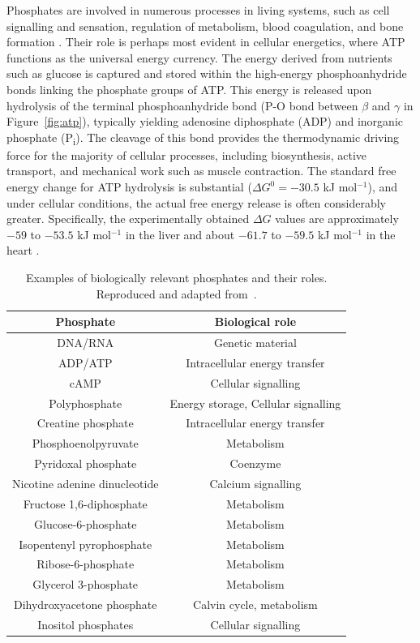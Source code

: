 Phosphates are involved in numerous processes in living systems, such as cell signalling and sensation, regulation of metabolism, blood coagulation, and bone formation \citep{mullerInorganicPolyphosphatesStorage2019, nebesnayaInorganicPolyphosphateRegulates2024}. Their role is perhaps most evident in cellular energetics, where ATP functions as the universal energy currency. The energy derived from nutrients such as glucose is captured and stored within the high-energy phosphoanhydride bonds linking the phosphate groups of ATP. This energy is released upon hydrolysis of the terminal phosphoanhydride bond (P-O bond between $\beta$ and $\gamma$ in Figure~\ref{fig:atp}), typically yielding adenosine diphosphate (ADP) and inorganic phosphate (P\textsubscript{i}). The cleavage of this bond provides the thermodynamic driving force for the majority of cellular processes, including biosynthesis, active transport, and mechanical work such as muscle contraction. The standard free energy change for ATP hydrolysis is substantial ($\Delta G^{0}=-30.5$ kJ mol$^{-1}$), and under cellular conditions, the actual free energy release is often considerably greater. Specifically, the experimentally obtained $\Delta G$ values are approximately $-59$ to $-53.5$ kJ mol$^{-1}$ in the liver and about $-61.7$ to $-59.5$ kJ mol$^{-1}$ in the heart \citep{mullerInorganicPolyphosphatesStorage2019}.

\begin{table}[b!]
    \centering
    \begin{tabular}{cc}
    \toprule
    \textbf{Phosphate} & \textbf{Biological role} \\ 
    \midrule
    DNA/RNA & Genetic material \\
    ADP/ATP & Intracellular energy transfer \\
    cAMP & Cellular signalling \\
    Polyphosphate & Energy storage, Cellular signalling \\
    Creatine phosphate & Intracellular energy transfer \\
    Phosphoenolpyruvate & Metabolism \\
    Pyridoxal phosphate & Coenzyme \\
    Nicotine adenine dinucleotide & Calcium signalling \\
    Fructose 1,6-diphosphate & Metabolism \\
    Glucose-6-phosphate & Metabolism \\
    Isopentenyl pyrophosphate & Metabolism \\
    Ribose-6-phosphate & Metabolism \\
    Glycerol 3-phosphate & Metabolism \\
    Dihydroxyacetone phosphate & Calvin cycle, metabolism \\
    Inositol phosphates & Cellular signalling \\
    \bottomrule
    \end{tabular}
    \caption{Examples of biologically relevant phosphates and their roles. Reproduced and adapted from~\citep{kamerlinWhyNatureReally2013}.}
    \label{tab:role_of_phosphates}
\end{table}

